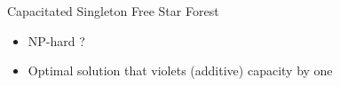 \begin{frame}{Capacitated Singleton Free Star Forest}
\begin{itemize}[<+->]
  \item NP-hard ?
  \item Optimal solution that violets (additive) capacity by one
\end{itemize}
\end{frame}